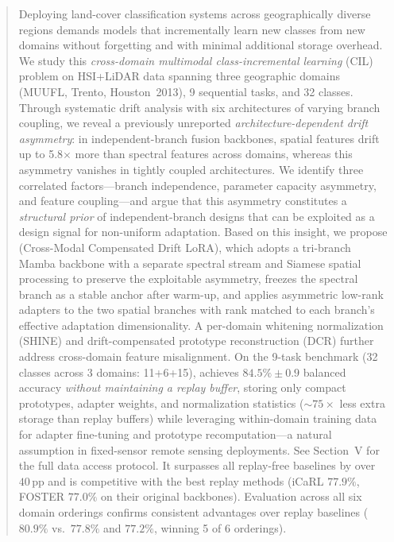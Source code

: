 \begin{abstract}
Deploying land-cover classification systems across geographically diverse regions demands models that incrementally learn new classes from new domains without forgetting and with minimal additional storage overhead.
We study this \emph{cross-domain multimodal class-incremental learning} (CIL) problem on HSI+LiDAR data spanning three geographic domains (MUUFL, Trento, Houston~2013), 9 sequential tasks, and 32 classes.
Through systematic drift analysis with six architectures of varying branch coupling, we reveal a previously unreported \emph{architecture-dependent drift asymmetry}: in independent-branch fusion backbones, spatial features drift up to 5.8$\times$ more than spectral features across domains, whereas this asymmetry vanishes in tightly coupled architectures.
We identify three correlated factors---branch independence, parameter capacity asymmetry, and feature coupling---and argue that this asymmetry constitutes a \emph{structural prior} of independent-branch designs that can be exploited as a design signal for non-uniform adaptation.
Based on this insight, we propose \methodname{} (Cross-Modal Compensated Drift LoRA), which adopts a tri-branch Mamba backbone with a separate spectral stream and Siamese spatial processing to preserve the exploitable asymmetry, freezes the spectral branch as a stable anchor after warm-up, and applies asymmetric low-rank adapters to the two spatial branches with rank matched to each branch's effective adaptation dimensionality.
A per-domain whitening normalization (SHINE) and drift-compensated prototype reconstruction (DCR) further address cross-domain feature misalignment.
On the 9-task benchmark (32 classes across 3 domains: 11+6+15), \methodname{} achieves $84.5\% \pm 0.9$ balanced accuracy \emph{without maintaining a replay buffer}, storing only compact prototypes, adapter weights, and normalization statistics (${\sim}75\times$ less extra storage than replay buffers) while leveraging within-domain training data for adapter fine-tuning and prototype recomputation---a natural assumption in fixed-sensor remote sensing deployments. See Section~V for the full data access protocol.
It surpasses all replay-free baselines by over $40$\,pp and is competitive with the best replay methods (iCaRL $77.9\%$, FOSTER $77.0\%$ on their original backbones).
Evaluation across all six domain orderings confirms consistent advantages over replay baselines ($80.9\%$ vs.\ $77.8\%$ and $77.2\%$, winning 5 of 6 orderings).
\end{abstract}
